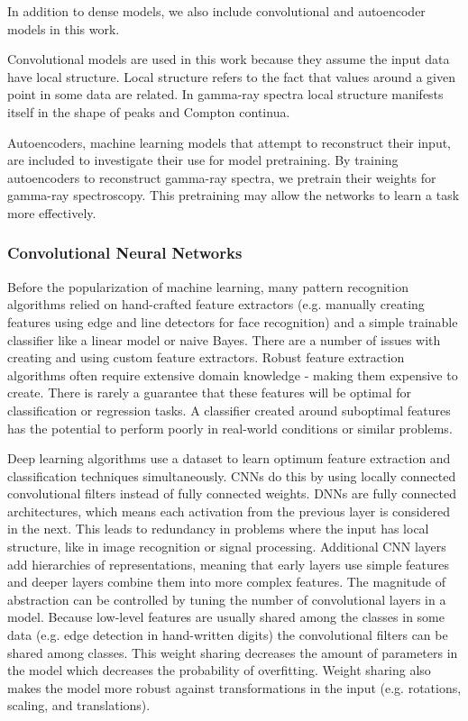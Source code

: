 In addition to dense models, we also include convolutional and autoencoder models in this work.

Convolutional models are used in this work because they assume the input data have local structure. Local structure refers to the fact that values around a given point in some data are related. In gamma-ray spectra local structure manifests itself in the shape of peaks and Compton continua.

Autoencoders, machine learning models that attempt to reconstruct their input, are included to investigate their use for model pretraining. By training autoencoders to reconstruct gamma-ray spectra, we pretrain their weights for gamma-ray spectroscopy. This pretraining may allow the networks to learn a task more effectively.

\subsubsection{Convolutional Neural Networks}

Before the popularization of machine learning, many pattern recognition algorithms relied on hand-crafted feature extractors (e.g. manually creating features using edge and line detectors for face recognition) and a simple trainable classifier like a linear model or naive Bayes. There are a number of issues with creating and using custom feature extractors. Robust feature extraction algorithms often require extensive domain knowledge - making them expensive to create. There is rarely a guarantee that these features will be optimal for classification or regression tasks. A classifier created around suboptimal features has the potential to perform poorly in real-world conditions or similar problems.

Deep learning algorithms use a dataset to learn optimum feature extraction and classification techniques simultaneously. CNNs do this by using locally connected convolutional filters instead of fully connected weights. DNNs are fully connected architectures, which means each activation from the previous layer is considered in the next. This leads to redundancy in problems where the input has local structure, like in image recognition or signal processing. Additional CNN layers add hierarchies of representations, meaning that early layers use simple features and deeper layers combine them into more complex features. The magnitude of abstraction can be controlled by tuning the number of convolutional layers in a model. Because low-level features are usually shared among the classes in some data (e.g. edge detection in hand-written digits) the convolutional filters can be shared among classes. This weight sharing decreases the amount of parameters in the model which decreases the probability of overfitting. Weight sharing also makes the model more robust against transformations in the input (e.g. rotations, scaling, and translations).

